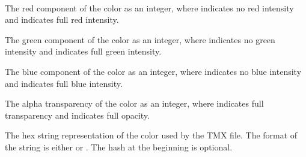 \documentclass[letterpaper,10pt,english]{sphinxmanual}
\begin{document}
\begin{fulllineitems}
\label{index:tmx.Color}~

\begin{fulllineitems}
\label{index:tmx.Color.red}
The red component of the color as an integer, where 
indicates no red intensity and  indicates full red
intensity.

\end{fulllineitems}


\begin{fulllineitems}
\label{index:tmx.Color.green}
The green component of the color as an integer, where 
indicates no green intensity and  indicates full green
intensity.

\end{fulllineitems}


\begin{fulllineitems}
\label{index:tmx.Color.blue}
The blue component of the color as an integer, where 
indicates no blue intensity and  indicates full blue
intensity.

\end{fulllineitems}


\begin{fulllineitems}
\label{index:tmx.Color.alpha}
The alpha transparency of the color as an integer, where 
indicates full transparency and  indicates full opacity.

\end{fulllineitems}


\begin{fulllineitems}
\label{index:tmx.Color.hex_string}
The hex string representation of the color used by the TMX file.
The format of the string is either  or
.  The hash at the beginning is optional.

\end{fulllineitems}


\end{fulllineitems}
\end{document}
